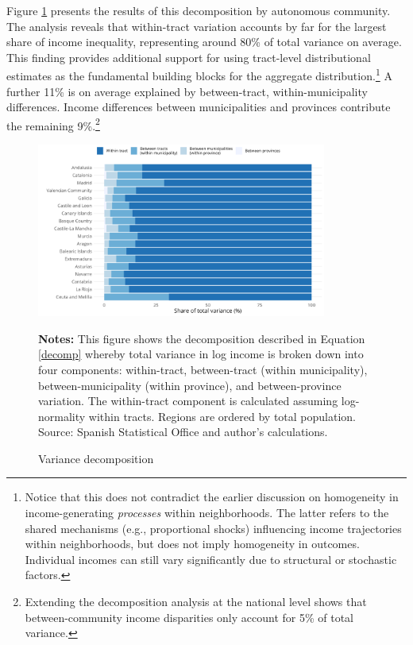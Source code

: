 Figure \ref{fig:variance_decomp} presents the results of this decomposition by autonomous community. The analysis reveals that within-tract variation accounts by far for the largest share of income inequality, representing around 80\% of total variance on average. This finding provides additional support for using tract-level distributional estimates as the fundamental building blocks for the aggregate distribution.\footnote{Notice that this does not contradict the earlier discussion on homogeneity in income-generating \textit{processes} within neighborhoods. The latter refers to the shared mechanisms (e.g., proportional shocks) influencing income trajectories within neighborhoods, but does not imply homogeneity in outcomes. Individual incomes can still vary significantly due to structural or stochastic factors.} A further 11\% is on average explained by between-tract, within-municipality differences. Income differences between municipalities and provinces contribute the remaining 9\%.\footnote{Extending the decomposition analysis at the national level shows that between-community income disparities only account for 5\% of total variance.}


\begin{figure}[H]
\begin{center}
\captionsetup{justification=centering}
\caption{Variance decomposition}
\label{fig:variance_decomp}
\includegraphics[width=0.85\textwidth]{output/variance_decomp.png}
\end{center}
\begin{fignotes2}
\textbf{Notes:} This figure shows the decomposition described in Equation \ref{decomp} whereby total variance in log income is broken down into four components: within-tract, between-tract (within municipality), between-municipality (within province), and between-province variation. The within-tract component is calculated assuming log-normality within tracts. Regions are ordered by total population. Source: Spanish Statistical Office and author's calculations.
\end{fignotes2}
\end{figure}